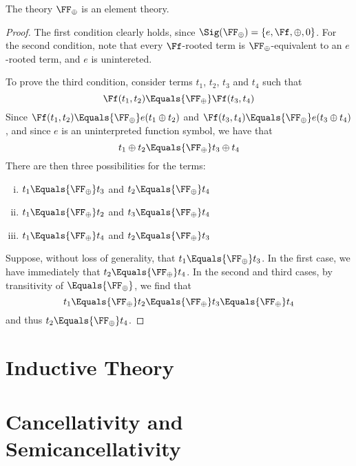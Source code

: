 \begin{Lemma}
    The theory $\FF_\oplus$ is an element theory.
\end{Lemma}
\begin{proof}
    The first condition clearly holds, since $\Sig(\FF_\oplus) = \{ e, \Ff,
    \oplus, 0 \}$. For the second condition, note that every $\Ff$-rooted
    term is $\FF_\oplus$-equivalent to an $e$-rooted term, and $e$ is unintereted.

    To prove the third condition, consider terms $t_1$, $t_2$, $t_3$ and $t_4$
    such that
    \[\Ff(t_1, t_2) \Equals{\FF_\oplus} \Ff(t_3, t_4)\]
    Since $\Ff(t_1, t_2) \Equals{\FF_\oplus} e(t_1 \oplus t_2)$ and $\Ff(t_3,
    t_4) \Equals{\FF_\oplus} e(t_3 \oplus t_4)$, and since $e$ is an uninterpreted
    function symbol, we have that
    \[t_1 \oplus t_2 \Equals{\FF_\oplus} t_3 \oplus t_4\]
    There are then three possibilities for the terms:
    \begin{enumerate}[(i)]
        \item $t_1 \Equals{\FF_\oplus} t_3$ and $t_2 \Equals{\FF_\oplus} t_4$
        \item $t_1 \Equals{\FF_\oplus} t_2$ and $t_3 \Equals{\FF_\oplus} t_4$
        \item $t_1 \Equals{\FF_\oplus} t_4$ and $t_2 \Equals{\FF_\oplus} t_3$
    \end{enumerate}
    Suppose, without loss of generality, that $t_1 \Equals{\FF_\oplus} t_3$. In the
    first case, we have immediately that $t_2 \Equals{\FF_\oplus} t_4$. In the
    second and third cases, by transitivity of $\Equals{\FF_\oplus}$, we find that
    \[t_1 \Equals{\FF_\oplus} t_2 \Equals{\FF_\oplus} t_3 \Equals{\FF_\oplus} t_4 \]
    and thus $t_2 \Equals{\FF_\oplus} t_4$.
\end{proof}

\section{Inductive Theory}\label{sec:inductive-theory}

\section{Cancellativity and Semicancellativity}\label{sec:cancel}

